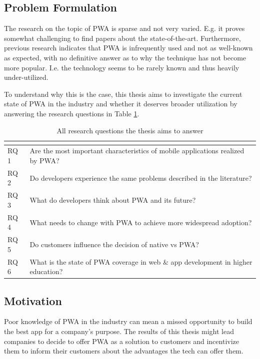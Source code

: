 \documentclass[a4paper,12pt]{article}
\begin{document}
\subsection{Problem Formulation}
\label{Intro_problem}
The research on the topic of PWA is sparse and not very varied. E.g. it proves somewhat challenging to find papers about the state-of-the-art. Furthermore, previous research indicates that PWA is infrequently used and not as well-known as expected, with no definitive answer as to why the technique has not become more popular. I.e. the technology seems to be rarely known and thus heavily under-utilized.

To understand why this is the case, this thesis aims to investigate the current state of PWA in the industry and whether it deserves broader utilization by answering the research questions in Table \ref{tab:rqs}.

\begin{table}[t]
\centering
{}
\begin{tabular}{|l|p{12.5cm}|}
\hline
\multicolumn{2}{|c|}{\cellcolor[HTML]{343434}{\color[HTML]{FFFFFF} Research questions}} \\ \hline
RQ 1 & Are the most important characteristics of mobile applications realized by PWA? \\
RQ 2 & Do developers experience the same problems described in the literature? \\
RQ 3 & What do developers think about PWA and its future? \\
RQ 4 & What needs to change with PWA to achieve more widespread adoption? \\
RQ 5 & Do customers influence the decision of native vs PWA? \\
RQ 6 & What is the state of PWA coverage in web \& app development in higher education? \\ \hline
\end{tabular}
\caption{All research questions the thesis aims to answer}
\label{tab:rqs}
\end{table}

\newpage

\subsection{Motivation}
\label{Intro_motivation}
Poor knowledge of PWA in the industry can mean a missed opportunity to build the best app for a company’s purpose. The results of this thesis might lead companies to decide to offer PWA as a solution to customers and incentivize them to inform their customers about the advantages the tech can offer them.
\end{document}
